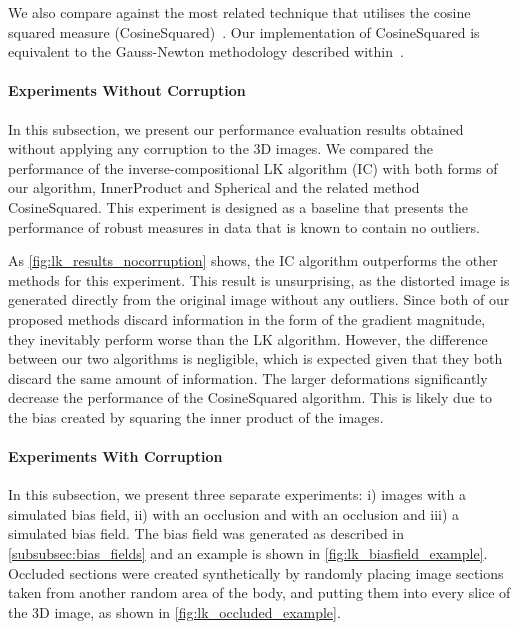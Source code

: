 We also compare against the most related technique that utilises the cosine
squared measure (CosineSquared)~\cite{haber2006intensity}. Our implementation of
CosineSquared is equivalent to the Gauss-Newton methodology described
within~\cite{haber2006intensity}.
\paragraph{Experiments Without Corruption}\label{subsec:lk_results_nocorruption}
In this subsection, we present our performance evaluation results obtained
without applying any corruption to the 3D images. We compared the performance of
the inverse-compositional LK algorithm (IC) with both forms of our algorithm,
InnerProduct and Spherical and the related method CosineSquared. This experiment
is designed as a baseline that presents the performance of robust measures in
data that is known to contain no outliers.

As \cref{fig:lk_results_nocorruption} shows, the IC algorithm outperforms
the other methods for this experiment. This result is unsurprising, as the
distorted image is generated directly from the original image without any
outliers. Since both of our proposed methods discard information in the form of
the gradient magnitude, they inevitably perform worse than the LK algorithm.
However, the difference between our two algorithms is negligible, which is
expected given that they both discard the same amount of information. The larger
deformations significantly decrease the performance of the CosineSquared
algorithm. This is likely due to the bias created by squaring the inner product
of the images.
\paragraph{Experiments With Corruption}\label{subsec:lk_results_corrupted}
In this subsection, we present three separate experiments: i) images with a
simulated bias field, ii) with an occlusion and with an occlusion and iii) a simulated
bias field. The bias field was generated as described in
\cref{subsubsec:bias_fields} and an example is shown in
\cref{fig:lk_biasfield_example}. Occluded sections were created
synthetically by randomly placing image sections taken from another random area
of the body, and putting them into every slice of the 3D image, as shown in
\cref{fig:lk_occluded_example}.

